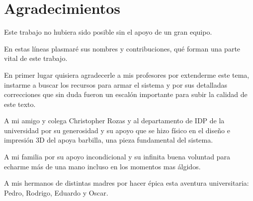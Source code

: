 \documentclass[\main/main.tex]{subfiles}
\begin{document}
\chapter{Agradecimientos}
	Este trabajo no hubiera sido posible sin el apoyo de un gran equipo.
	
	En estas líneas plasmaré sus nombres y contribuciones, qué forman una parte vital de este trabajo. 

	En primer lugar quisiera agradecerle a mis profesores por extenderme este tema, instarme a buscar los recursos para armar el sistema y por sus detalladas correcciones que sin duda fueron un escalón importante para subir la calidad de este texto.
	
	A mi amigo y colega Christopher Rozas y al departamento de IDP de la universidad por su generosidad y su apoyo que se hizo físico en el diseño e impresión 3D del apoya barbilla, una pieza fundamental del sistema.
	
	A mi familia por su apoyo incondicional y su infinita buena voluntad para echarme más de una mano incluso en los momentos mas álgidos.  

	A mis hermanos de distintas madres por hacer épica esta aventura universitaria: Pedro, Rodrigo, Eduardo y Oscar.
\end{document}
